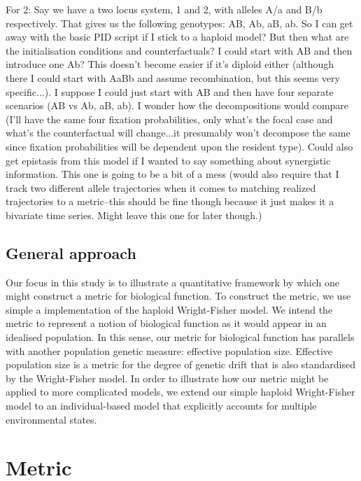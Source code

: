 \documentclass{article}
\begin{document}
For 2:
Say we have a two locus system, 1 and 2, with alleles A/a and B/b respectively.
That gives us the following genotypes: AB, Ab, aB, ab.
So I can get away with the basic PID script if I stick to a haploid model? But then what are the initialisation conditions and counterfactuals? I could start with AB and then introduce one Ab? This doesn't become easier if it's diploid either (although there I could start with AaBb and assume recombination, but this seems very specific...).
I suppose I could just start with AB and then have four separate scenarios (AB vs Ab, aB, ab). I wonder how the decompositions would compare (I'll have the same four fixation probabilities, only what's the focal case and what's the counterfactual will change...it presumably won't decompose the same since fixation probabilities will be dependent upon the resident type). Could also get epistasis from this model if I wanted to say something about synergistic information. This one is going to be a bit of a mess (would also require that I track two different allele trajectories when it comes to matching realized trajectories to a metric--this should be fine though because it just makes it a bivariate time series. Might leave this one for later though.)



\subsection{General approach}
\label{sec:general-approach}

Our focus in this study is to illustrate a quantitative framework by which one might construct a metric for biological function.
To construct the metric, we use simple a implementation of the haploid Wright-Fisher model.
We intend the metric to represent a notion of biological function as it would appear in an idealised population.
In this sense, our metric for biological function has parallels with another population genetic measure: effective population size.
Effective population size is a metric for the degree of genetic drift that is also standardised by the Wright-Fisher model.
In order to illustrate how our metric might be applied to more complicated models, we extend our simple haploid Wright-Fisher model to an individual-based model that explicitly accounts for multiple environmental states.

\section{Metric}
\label{sec:metric-1}
\end{document}
